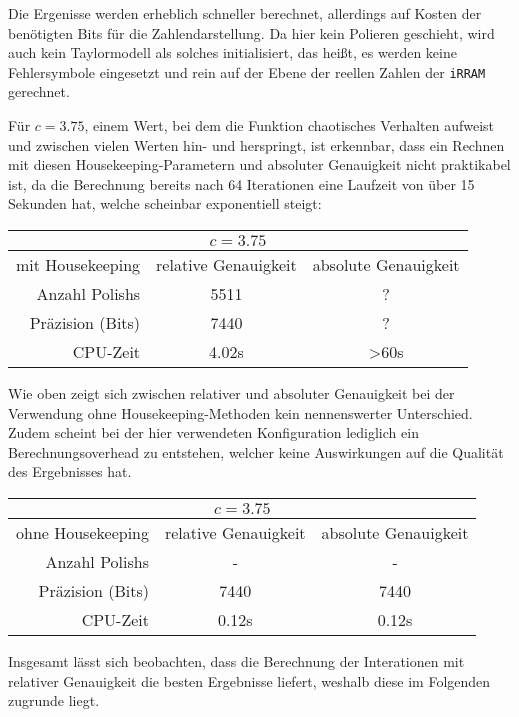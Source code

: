 Die Ergenisse werden erheblich schneller berechnet, allerdings auf Kosten der benötigten Bits für die Zahlendarstellung. Da hier kein Polieren geschieht, wird auch kein Taylormodell als solches initialisiert, das heißt, es werden keine Fehlersymbole eingesetzt und rein auf der Ebene der reellen Zahlen der \verb+iRRAM+ gerechnet.

Für $c=3.75$, einem Wert, bei dem die Funktion chaotisches Verhalten aufweist und zwischen vielen Werten hin- und herspringt, ist erkennbar, dass ein Rechnen mit diesen Housekeeping-Parametern und absoluter Genauigkeit nicht praktikabel ist, da die Berechnung bereits nach 64 Iterationen eine Laufzeit von über 15 Sekunden hat, welche scheinbar exponentiell steigt:

\begin{center}
\begin{tabular}{|r|c|c|}
\hline
\multicolumn{3}{|c|}{$c=3.75$}\\
\hline
 mit Housekeeping &relative Genauigkeit & absolute Genauigkeit \\
 \hline
 \hline
 Anzahl Polishs & 5511 & ?\\
 Präzision (Bits) & 7440 & ?\\
 CPU-Zeit & 4.02s & >60s\\
 \hline
\end{tabular}
\end{center}

Wie oben zeigt sich zwischen relativer und absoluter Genauigkeit bei der Verwendung ohne Housekeeping-Methoden kein nennenswerter Unterschied. Zudem scheint bei der hier verwendeten Konfiguration lediglich ein Berechnungsoverhead zu entstehen, welcher keine Auswirkungen auf die Qualität des Ergebnisses hat.


\begin{center}
\begin{tabular}{|r|c|c|}
\hline
\multicolumn{3}{|c|}{$c=3.75$}\\
\hline
 ohne Housekeeping &relative Genauigkeit & absolute Genauigkeit \\
 \hline
 \hline
 Anzahl Polishs & - & -\\
 Präzision (Bits) & 7440 & 7440\\
 CPU-Zeit & 0.12s & 0.12s\\
 \hline
\end{tabular}
\end{center}


Insgesamt lässt sich beobachten, dass die Berechnung der Interationen mit relativer Genauigkeit die besten Ergebnisse liefert, weshalb diese im Folgenden zugrunde liegt.

